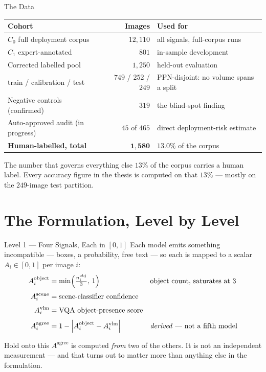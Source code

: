 \documentclass[aspectratio=169,11pt]{beamer}
\begin{document}
\begin{frame}{The Data}
\centering
\footnotesize
\begin{tabular}{@{}l r l@{}}
\toprule
\textbf{Cohort} & \textbf{Images} & \textbf{Used for} \\
\midrule
$C_0$ full deployment corpus & $12{,}110$ & all signals, full-corpus runs \\
$C_1$ expert-annotated & $801$ & in-sample development \\
Corrected labelled pool & $1{,}250$ & held-out evaluation \\
\quad train / calibration / test & $749$ / $252$ / $249$ & PPN-disjoint: no volume spans a split \\
Negative controls (confirmed) & $319$ & the blind-spot finding \\
Auto-approved audit (in progress) & $45$ of $465$ & direct deployment-risk estimate \\
\midrule
\textbf{Human-labelled, total} & $\mathbf{1{,}580}$ & $\mathbf{13.0\%}$ of the corpus \\
\bottomrule
\end{tabular}
\vspace{3mm}

\begin{alertblock}{\small The number that governs everything else}
\footnotesize $13\%$ of the corpus carries a human label. Every accuracy figure in the thesis is computed on that $13\%$ --- mostly on the $249$-image test partition.
\end{alertblock}
\end{frame}

\section{The Formulation, Level by Level}

\begin{frame}{Level 1 --- Four Signals, Each in $[0,1]$}
\small
Each model emits something incompatible --- boxes, a probability, free text --- so each is mapped to a scalar $A_i \in [0,1]$ per image $i$:
\vspace{1mm}
\begin{align*}
A_i^{\text{object}} &= \min\!\left(\tfrac{n_i^{\text{obj}}}{3},\,1\right) && \text{object count, saturates at } 3 \\[1mm]
A_i^{\text{scene}} &= \text{scene-classifier confidence} && \\[1mm]
A_i^{\text{vlm}} &= \text{VQA object-presence score} && \\[1mm]
A_i^{\text{agree}} &= 1 - \left|A_i^{\text{object}} - A_i^{\text{vlm}}\right| && \text{\emph{derived} --- not a fifth model}
\end{align*}
\vspace{1mm}
\begin{alertblock}{\small Hold onto this}
\footnotesize $A^{\text{agree}}$ is computed \emph{from} two of the others. It is not an independent measurement --- and that turns out to matter more than anything else in the formulation.
\end{alertblock}
\end{frame}
\end{document}
